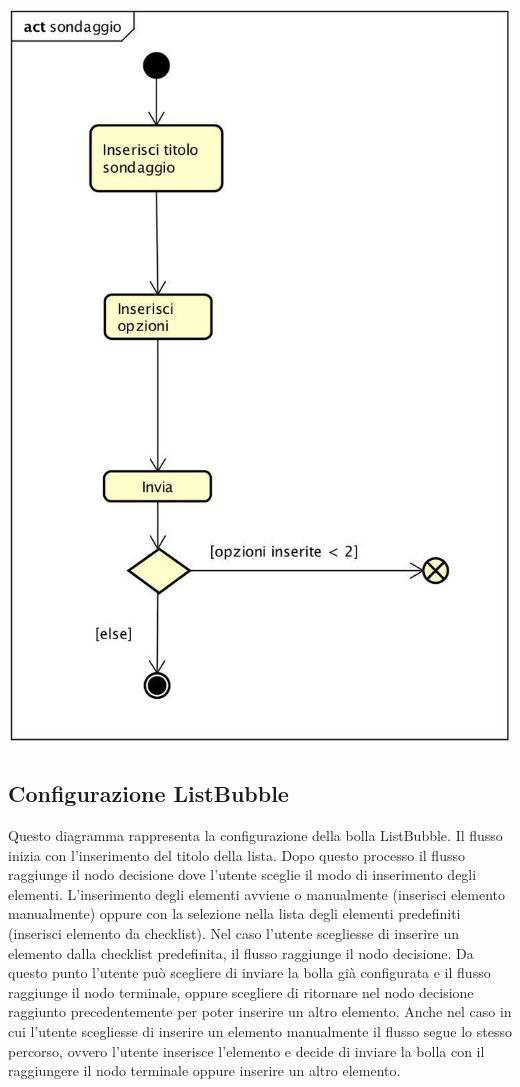 \begin{center}
  \includegraphics[scale=0.5]{img/Sondaggio.jpg}
\end{center}


\subsection{Configurazione ListBubble}
Questo diagramma rappresenta la configurazione della bolla
ListBubble. Il flusso inizia con l’inserimento del titolo della
lista. Dopo questo processo il flusso raggiunge il nodo decisione dove
l’utente sceglie il modo di inserimento degli elementi. L’inserimento
degli elementi avviene o manualmente (inserisci elemento manualmente)
oppure con la selezione nella lista degli elementi predefiniti
(inserisci elemento da checklist). Nel caso l’utente scegliesse di
inserire un elemento dalla checklist predefinita, il flusso raggiunge
il nodo decisione. Da questo punto l’utente può scegliere di inviare
la bolla già configurata e il flusso raggiunge il nodo terminale,
oppure scegliere di ritornare nel nodo decisione raggiunto
precedentemente per poter inserire un altro elemento. Anche nel caso
in cui l’utente scegliesse di inserire un elemento manualmente il
flusso segue lo stesso percorso, ovvero l’utente inserisce l’elemento
e decide di inviare la bolla con il raggiungere il nodo terminale
oppure inserire un altro elemento. 

